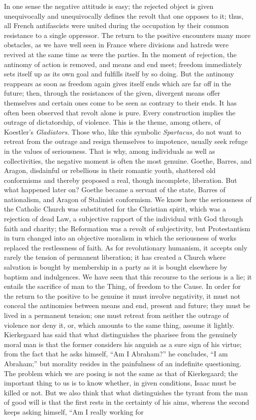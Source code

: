 \documentclass[11pt]{article}
\begin{document}
{{In one sense the negative attitude is easy; the rejected object is given unequivocally and unequivocally defines the revolt that one opposes to it; thus, all French antifascists were united during the occupation by their common resistance to a single oppressor. The return to the positive encounters many more obstacles, as we have well seen in France where divisions and hatreds were revived at the same time as were the parties. In the moment of rejection, the antinomy of action is removed, and means and end meet; freedom immediately sets itself up as its own goal and fulfills itself by so doing. But the antinomy reappears as soon as freedom again gives itself ends which are far off in the future; then, through the resistances of the given, divergent means offer themselves and certain ones come to be seen as contrary to their ends. It has often been observed that revolt alone is pure. Every construction implies the outrage of dictatorship, of violence. This is the theme, among others, of Koestler’s \textit{Gladiators. }Those who, like this symbolic \textit{Spartacus, }do not want to retreat from the outrage and resign themselves to impotence, usually seek refuge in the values of seriousness. That is why, among individuals as well as collectivities, the negative moment is often the most genuine. Goethe, Barres, and Aragon, disdainful or rebellious in their romantic youth, shattered old conformisms and thereby proposed a real, though incomplete, liberation. But what happened later on? Goethe became a servant of the state, Barres of nationalism, and Aragon of Stalinist conformism. We know how the seriousness of the Catholic Church was substituted for the Christian spirit, which was a rejection of dead Law, a subjective rapport of the individual with God through faith and charity; the Reformation was a revolt of subjectivity, but Protestantism in turn changed into an objective moralism in which the seriousness of works replaced the restlessness of faith. As for revolutionary humanism, it accepts only rarely the tension of permanent liberation; it has created a Church where salvation is bought by membership in a party as it is bought elsewhere by baptism and indulgences. We have seen that this recourse to the serious is a lie; it entails the sacrifice of man to the Thing, of freedom to the Cause. In order for the return to the positive to be genuine it must involve negativity, it must not conceal the antinomies between means and end, present and future; they must be lived in a permanent tension; one must retreat from neither the outrage of violence nor deny it, or, which amounts to the same thing, assume it lightly. Kierkegaard has said that what distinguishes the pharisee from the genuinely moral man is that the former considers his anguish as a sure sign of his virtue; from the fact that he asks himself, “Am I Abraham?” he concludes, “I am Abraham;” but morality resides in the painfulness of an indefinite questioning. The problem which we are posing is not the same as that of Kierkegaard; the important thing to us is to know whether, in given conditions, Isaac must be killed or not. But we also think that what distinguishes the tyrant from the man of good will is that the first rests in the certainty of his aims, whereas the second keeps asking himself, “Am I really working for }}
\end{document}
